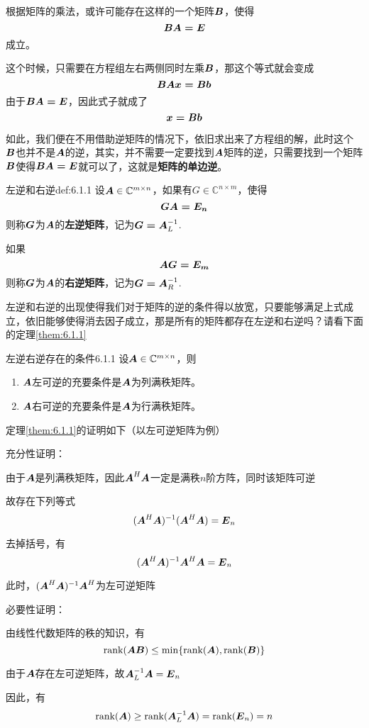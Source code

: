\documentclass[12pt, a4paper, oneside, UTF8]{ctexbook}
\begin{document}
根据矩阵的乘法，或许可能存在这样的一个矩阵$\boldsymbol{B}$，使得\[\boldsymbol{BA=E}\]
成立。

这个时候，只需要在方程组左右两侧同时左乘$\boldsymbol{B}$，那这个等式就会变成\[\boldsymbol{BAx=Bb}\]
由于$\boldsymbol{BA=E}$，因此式子就成了\[\boldsymbol{x=\boldsymbol{Bb}}\]

如此，我们便在不用借助逆矩阵的情况下，依旧求出来了方程组的解，此时这个$\boldsymbol{B}$也并不是$\boldsymbol{A}$的逆，其实，并不需要一定要找到$\boldsymbol{A}$矩阵的逆，只需要找到一个矩阵$\boldsymbol{B}$使得$\boldsymbol{BA=E}$就可以了，这就是\textbf{矩阵的单边逆}。
\begin{defn}{左逆和右逆}{def:6.1.1}
    设$\boldsymbol{A}\in\mathbb{C}^{m\times n}$，如果有$G\in\mathbb{C}^{n\times m}$，使得\[\boldsymbol{GA=E_n}\]则称$\boldsymbol{G}$为$\boldsymbol{A}$的\textbf{左逆矩阵}，记为$\boldsymbol{G=A}_L^{-1}$.

    如果\[\boldsymbol{AG=E_m}\]则称$\boldsymbol{G}$为$\boldsymbol{A}$的\textbf{右逆矩阵}，记为$\boldsymbol{G=A}_R^{-1}$.
\end{defn}

左逆和右逆的出现使得我们对于矩阵的逆的条件得以放宽，只要能够满足上式成立，依旧能够使得消去因子成立，那是所有的矩阵都存在左逆和右逆吗？请看下面的定理\ref{them:6.1.1}
\begin{them}{左逆右逆存在的条件}{6.1.1}
    设$\boldsymbol{A}\in\mathbb{C}^{m\times n}$，则
    \begin{enumerate}
        \item $\boldsymbol{A}$左可逆的充要条件是$\boldsymbol{A}$为列满秩矩阵。
        \item $\boldsymbol{A}$右可逆的充要条件是$\boldsymbol{A}$为行满秩矩阵。
    \end{enumerate}
\end{them}

定理\ref{them:6.1.1}的证明如下（以左可逆矩阵为例）

充分性证明：

由于$\boldsymbol{A}$是列满秩矩阵，因此$\boldsymbol{A}^H\boldsymbol{A}$一定是满秩$n$阶方阵，同时该矩阵可逆

故存在下列等式\[(\boldsymbol{A}^H\boldsymbol{A})^{-1}(\boldsymbol{A}^H\boldsymbol{A})=\boldsymbol{E}_n\]

去掉括号，有\[(\boldsymbol{A}^H\boldsymbol{A})^{-1}\boldsymbol{A}^H\boldsymbol{A}=\boldsymbol{E}_n\]

此时，$(\boldsymbol{A}^H\boldsymbol{A})^{-1}\boldsymbol{A}^H$为左可逆矩阵

必要性证明：

由线性代数矩阵的秩的知识，有\[\text{rank}(\boldsymbol{AB}) \leq \min\{\text{rank}(\boldsymbol{A}),\text{rank}(\boldsymbol{B})\}\]

由于$\boldsymbol{A}$存在左可逆矩阵，故$\boldsymbol{A}_L^{-1}\boldsymbol{A}=\boldsymbol{E}_n$

因此，有\[\text{rank}(\boldsymbol{A})\geq\text{rank}(\boldsymbol{A}_L^{-1}\boldsymbol{A})=\text{rank}(\boldsymbol{E}_n)=n\]
\end{document}
